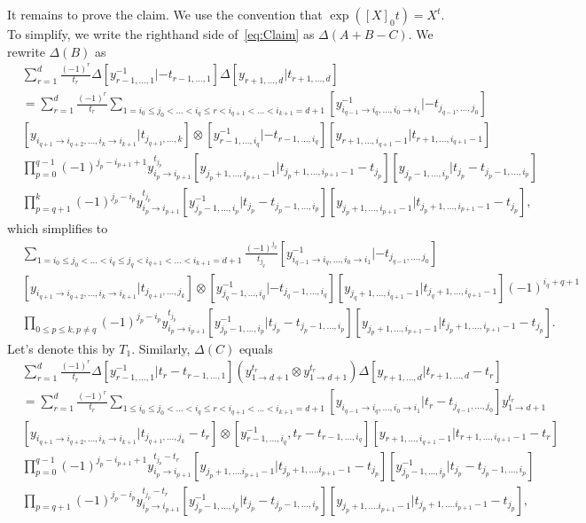 It remains to prove the claim. We use the convention that $\exp([X]_0t)=X^t$. To simplify, we write the righthand side of~\eqref{eq:Claim} as $\Delta(A+B-C)$. We rewrite $\Delta(B)$ as
\begin{align*}
&\sum_{r=1}^d\frac{(-1)^r}{t_r}\Delta[y_{r-1,\dots,1}^{-1}|-t_{r-1,\dots,1}]\Delta[y_{r+1,\dots,d}|t_{r+1,\dots,d}]\\
&=\sum_{r=1}^d\frac{(-1)^r}{t_r}\sum_{1=i_0\leq j_0<\dots<i_q\leq r<i_{q+1}<\dots<i_{k+1}=d+1}[y_{i_{q-1}\to i_q,\dots,i_0\to i_1}^{-1}|-t_{j_{q-1},\dots,j_0}]\\
&[y_{i_{q+1}\to i_{q+2},\dots,i_k\to i_{k+1}}|t_{j_{q+1},\dots,k}]\otimes[y_{r-1,\dots,i_q}^{-1}|-t_{r-1,\dots,i_q}][y_{r+1,\dots,i_{q+1}-1}|t_{r+1,\dots,i_{q+1}-1}]\\
&\prod_{p=0}^{q-1}(-1)^{j_p-i_{p+1}+1}y_{i_p\to i_{p+1}}^{t_{j_p}}[y_{j_p+1,\dots,i_{p+1}-1}|t_{j_p+1,\dots,i_{p+1}-1}-t_{j_p}][y_{j_p-1,\dots,i_p}|t_{j_p}-t_{j_p-1,\dots,i_p}]\\
&\prod_{p=q+1}^k(-1)^{j_p-i_p}y_{i_p\to i_{p+1}}^{t_{j_p}}[y_{j_p-1,\dots,i_p}^{-1}|t_{j_p}-t_{j_p-1,\dots,i_p}][y_{j_p+1,\dots,i_{p+1}-1}|t_{j_p+1,\dots,i_{p+1}-1}-t_{j_p}],
\end{align*}
which simplifies to
\begin{align*}
&\sum_{1=i_0\leq j_0<\dots<i_q\leq j_q<i_{q+1}<\dots<i_{k+1}=d+1}\frac{(-1)^{j_q}}{t_{j_q}}[y_{i_{q-1}\to i_q,\dots,i_0\to i_1}^{-1}|-t_{j_{q-1},\dots,j_0}]\\
&[y_{i_{q+1}\to i_{q+2},\dots,i_k\to i_{k+1}}|t_{j_{q+1},\dots,j_k}]\otimes[y_{j_q-1,\dots,i_q}^{-1}|-t_{j_q-1,\dots,i_q}][y_{j_q+1,\dots,i_{q+1}-1}|t_{j_q+1,\dots,i_{q+1}-1}](-1)^{i_q+q+1}\\
&\prod_{0\leq p\leq k,p\neq q}(-1)^{j_p-i_p}y_{i_p\to i_{p+1}}^{t_{j_p}}[y_{j_p-1,\dots,i_p}^{-1}|t_{j_p}-t_{j_p-1,\dots,i_p}][y_{j_p+1,\dots,i_{p+1}-1}|t_{j_p+1,\dots,i_{p+1}-1}-t_{j_p}].
\end{align*}
Let's denote this by $T_1$. Similarly, $\Delta(C)$ equals
\begin{align*}
&\sum_{r=1}^d\frac{(-1)^r}{t_r}\Delta[y_{r-1,\dots,1}^{-1}|t_r-t_{r-1,\dots,1}]\left(y_{1\to d+1}^{t_r}\otimes y_{1\to d+1}^{t_r}\right)\Delta[y_{r+1,\dots,d}|t_{r+1,\dots,d}-t_r]\\
&=\sum_{r=1}^d\frac{(-1)^r}{t_r}\sum_{1\leq i_0\leq j_0<\dots<i_q\leq r<i_{q+1}<\dots<i_{k+1}=d+1}[y_{i_{q-1}\to i_q,\dots,i_0\to i_1}|t_r-t_{j_{q-1},\dots,j_0}]y_{1\to d+1}^{t_r}\\
&[y_{i_{q+1}\to i_{q+2},\dots,i_k\to i_{k+1}}|t_{j_{q+1},\dots,j_k}-t_r]\otimes[y_{r-1,\dots,i_q}^{-1},t_r-t_{r-1,\dots,i_q}][y_{r+1,\dots,i_{q+1}-1}|t_{r+1,\dots,i_{q+1}-1}-t_r]\\
&\prod_{p=0}^{q-1}(-1)^{j_p-i_{p+1}+1}y_{i_p\to i_{p+1}}^{t_{j_p}-t_r}[y_{j_p+1,\dots.i_{p+1}-1}|t_{j_p+1,\dots.i_{p+1}-1}-t_{j_p}][y_{j_p-1,\dots,i_p}^{-1}|t_{j_p}-t_{j_p-1,\dots,i_p}]\\
&\prod_{p=q+1}(-1)^{j_p-i_p}y_{i_p\to i_{p+1}}^{t_{j_p}-t_r}[y_{j_p-1,\dots,i_p}^{-1}|t_{j_p}-t_{j_p-1,\dots,i_p}][y_{j_p+1,\dots.i_{p+1}-1}|t_{j_p+1,\dots.i_{p+1}-1}-t_{j_p}],
\end{align*}
